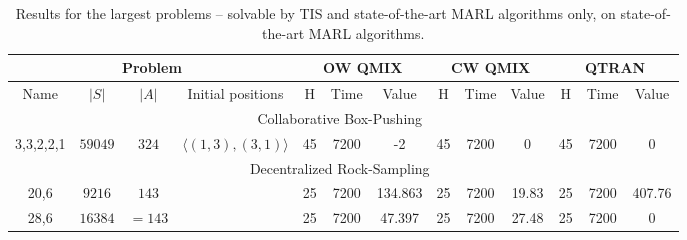 \documentclass[runningheads]{llncs}
\newcommand{\cbp}[0]{Collaborative Box-Pushing}
\newcommand{\drs}[0]{Decentralized Rock-Sampling}
\begin{document}
{\begin{table}[t]
\end{table}



\begin{table}[t]
\centering
\footnotesize
    \begin{tabular}{|c|c|c|c||c|c|c||c|c|c||c|c|c|}
         \hline
         \multicolumn{4}{|c||}{Problem} & \multicolumn{3}{c|}{OW QMIX} & 
         \multicolumn{3}{c|}{CW QMIX} &
         \multicolumn{3}{c|}{QTRAN}
         \\ 
         \hline
         Name & $|S|$ & $|A|$ & Initial positions & H & Time & Value & H & Time & Value & H & Time & Value  \\
         \hline
         \multicolumn{13}{|c|}{\cbp\ }\\
          
         
         \hline
         3,3,2,2,1 &
         $59049$&$324$ &$\langle(1,3),(3,1)\rangle$ & 45 & 7200 & -2 & 45 & 7200 & 0 & 45 & 7200 & 0 \\
         
         \hline
         \multicolumn{13}{|c|}{\drs\ }\\

         \hline
         20,6 &
         $9216$&$143$ & & 25 & 7200 & 134.863 & 25 & 7200 & 19.83 & 25 & 7200 & 407.76 \\
         
         \hline
         28,6 &
         $16384$&$=143$ & & 25 & 7200 & 47.397 & 25 & 7200 & 27.48 & 25 & 7200 & 0 \\
         \hline
    \end{tabular}
    
    \caption{\label{tbl:maxres} Results for the largest problems -- solvable by TIS and state-of-the-art MARL algorithms only, on state-of-the-art MARL algorithms. %
   }
    
\end{table}
}
\end{document}

